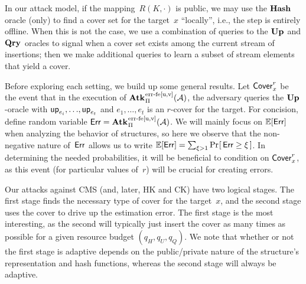 \noindent
In our attack model, if the mapping~$R(K,\cdot)$ is public, we may use the $\textup{\textbf{Hash}}\hspace{0.5pt}$ oracle (only) to find a cover set for the target~$x$ ``locally'', i.e., the step is entirely offline.  When this is not the case, we use a combination of queries to the $\textup{\textbf{Up}}\hspace{0.5pt}$ and $\textup{\textbf{Qry}}\hspace{0.5pt}$ oracles to signal when a cover set exists among the current stream of insertions; then we make additional queries to learn a subset of stream elements that yield a cover. 

Before exploring each setting, we build up some general results. 
Let $\mathsf{Cover}^{r}_{x}$ be the event that in the execution of $\ExpErrFe{\struct}{\advA}{u,v}$, the adversary queries the $\textup{\textbf{Up}}\hspace{0.5pt}$-oracle with $\mathsf{up}_{e_i},{\dots},\mathsf{up}_{e_t}$ and $e_1,{\dots},e_t$ is an $r$-cover for the target.  For concision, define random variable $\rverr=\ExpErrFe{\struct}{\advA}{u,v}$.  We will mainly focus on $\mathbb{E}[\mathsf{Err}]$ when analyzing the behavior of structures, so here we observe that the non-negative nature of~$\mathsf{Err}$ allows us to write $\mathbb{E}[\mathsf{Err}]=\sum_{\xi > 1} \Pr\hspace{-1pt}\left[\,\mathsf{Err} \geq \xi\,\right]$.  In determining the needed probabilities, it will be beneficial to condition on $\mathsf{Cover}^{r}_{x}$, 
as this event (for particular values of~$r$) will be crucial for creating errors. 


Our attacks against CMS (and, later, HK and CK) have two logical stages.  The first stage finds the necessary type of cover for the target~$x$, and the second stage uses the cover to drive up the estimation error.  The first stage is the most interesting, as the second will typically just insert the cover as many times as possible for a given resource budget $(q_H,q_U,q_Q)$.  We note that whether or not the first stage is adaptive depends on the public/private nature of the structure's representation and hash functions, whereas the second stage will always be adaptive.  

